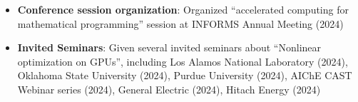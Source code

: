 \documentclass[letterpaper, 11pt]{article}
\begin{document}
\begin{itemize}[itemsep=1pt, parsep=0pt,leftmargin=*]
\item[] \textbf{Conference session organization}: Organized ``accelerated computing for mathematical programming'' session at INFORMS Annual Meeting (2024)
\item[] \textbf{Invited Seminars}: Given several invited seminars about ``Nonlinear optimization on GPUs'', including Los Alamos National Laboratory (2024), Oklahoma State University (2024), Purdue University (2024), AIChE CAST Webinar series (2024), General Electric (2024), Hitach Energy (2024)
\end{itemize}





\end{document}
